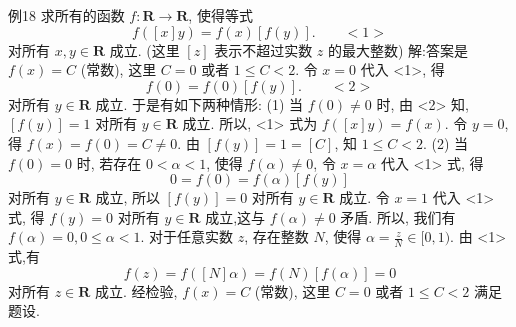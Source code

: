 例18 求所有的函数 $f: \mathbf{R} \rightarrow \mathbf{R}$, 使得等式
$$
f([x] y)=f(x)[f(y)] .  \quad\quad <1>
$$
对所有 $x, y \in \mathbf{R}$ 成立.
(这里 $[z]$ 表示不超过实数 $z$ 的最大整数)
解:答案是 $f(x)=C$ (常数), 这里 $C=0$ 或者 $1 \leqslant C<2$.
令 $x=0$ 代入 <1>, 得
$$
f(0)=f(0)[f(y)] .  \quad\quad <2>
$$
对所有 $y \in \mathbf{R}$ 成立.
于是有如下两种情形:
(1) 当 $f(0) \neq 0$ 时, 由 <2> 知, $[f(y)]=1$ 对所有 $y \in \mathbf{R}$ 成立.
所以, <1> 式为 $f([x] y)=f(x)$. 令 $y=0$, 得 $f(x)=f(0)=C \neq 0$.
由 $[f(y)]=1=[C]$, 知 $1 \leqslant C<2$.
(2) 当 $f(0)=0$ 时, 若存在 $0<\alpha<1$, 使得 $f(\alpha) \neq 0$, 令 $x=\alpha$ 代入 <1> 式, 得
$$
0=f(0)=f(\alpha)[f(y)]
$$
对所有 $y \in \mathbf{R}$ 成立, 所以 $[f(y)]=0$ 对所有 $y \in \mathbf{R}$ 成立.
令 $x=1$ 代入 <1> 式, 得 $f(y)=0$ 对所有 $y \in \mathbf{R}$ 成立,这与 $f(\alpha) \neq 0$ 矛盾.
所以, 我们有 $f(\alpha)=0,0 \leqslant \alpha<1$. 对于任意实数 $z$, 存在整数 $N$, 使得 $\alpha=\frac{z}{N} \in[0,1)$. 由 <1> 式,有
$$
f(z)=f([N] \alpha)=f(N)[f(\alpha)]=0
$$
对所有 $z \in \mathbf{R}$ 成立.
经检验, $f(x)=C$ (常数), 这里 $C=0$ 或者 $1 \leqslant C<2$ 满足题设.



